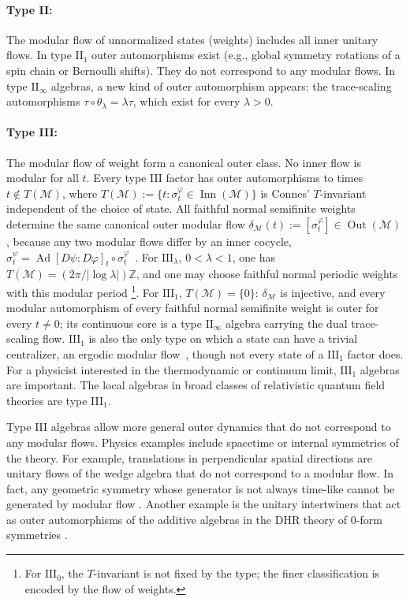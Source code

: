 \documentclass[a4paper,11pt]{article}
\theoremstyle{definition}
\newcommand{\mM}{\mathcal{M}}
\begin{document}
\paragraph{Type II:} The modular flow of unnormalized states (weights) includes all inner unitary flows. 
In type $\mathrm{II}_1$ outer automorphisms exist (e.g., global symmetry rotations of a spin chain or Bernoulli shifts). They do not correspond to any modular flows.
In type $\mathrm{II}_\infty$ algebras, a new kind of outer automorphism appears: the trace-scaling automorphisms $\tau\circ\theta_\lambda=\lambda\tau$, which exist for every $\lambda>0$.

\paragraph{Type III:} The modular flow of weight form a canonical outer class.
No inner flow is modular for all $t$. Every type III factor has outer automorphisms to times $t\notin T(\mM)$, where $T(\mM):=\{t:\sigma^\varphi_t\in\operatorname{Inn}(\mM)\}$ is Connes' $T$-invariant independent of the choice of state. All faithful normal semifinite weights determine the same canonical outer modular flow $\delta_{\mM}(t):=[\sigma^\varphi_t]\in\operatorname{Out}(\mM)$, because any two modular flows differ by an inner cocycle, $\sigma^\psi_t=\operatorname{Ad}[D\psi:D\varphi]_t\circ\sigma^\varphi_t$~\cite{Connes1973,ConnesTakesaki1977}. For $\mathrm{III}_\lambda$, $0<\lambda<1$, one has $T(\mM)=(2\pi/|\log\lambda|)\mathbb Z$, and one may choose faithful normal periodic weights with this modular period \footnote{For $\mathrm{III}_0$, the $T$-invariant is not fixed by the type; the finer classification is encoded by the flow of weights.}. For $\mathrm{III}_1$, $T(\mM)=\{0\}$: $\delta_{\mM}$ is injective, and every modular automorphism of every faithful normal semifinite weight is outer for every $t\ne0$; its continuous core is a type $\mathrm{II}_\infty$ algebra carrying the dual trace-scaling flow. $\mathrm{III}_1$ is also the only type on which a state can have a trivial centralizer, an ergodic modular flow~\cite{Connes1973,Longo1982}, though not every state of a $\mathrm{III}_1$ factor does. For a physicist interested in the thermodynamic or continuum limit, $\mathrm{III}_1$ algebras are important. The local algebras in broad classes of relativistic quantum field theories are type III$_1$. 
    
    Type III algebras allow more general outer dynamics that do not correspond to any modular flows. Physics examples include spacetime or internal symmetries of the theory. For example, translations in perpendicular spatial directions are unitary flows of the wedge algebra that do not correspond to a modular flow. In fact, any geometric symmetry whose generator is not always time-like cannot be generated by modular flow \cite{BenyKempfKribs2007}. Another example is the unitary intertwiners that act as outer automorphisms of the additive algebras in the DHR theory of $0$-form symmetries \cite{casini2020entanglement}. 
\end{document}
